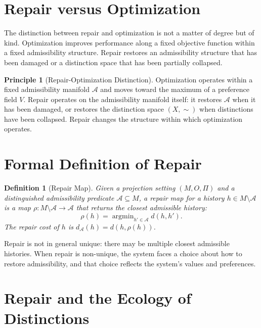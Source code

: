 \documentclass[12pt,a4paper]{book}
\newtheorem{definition}[theorem]{Definition}
\theoremstyle{remark}
\theoremstyle{definition}
\newtheorem{principle}{Principle}[chapter]
\begin{document}
\section{Repair versus Optimization}

The distinction between repair and optimization is not a matter of
degree but of kind. Optimization improves performance along a fixed
objective function within a fixed admissibility structure. Repair
restores an admissibility structure that has been damaged or a
distinction space that has been partially collapsed.

\begin{principle}[Repair-Optimization Distinction]
Optimization operates within a fixed admissibility manifold $\mathcal{A}$
and moves toward the maximum of a preference field $V$. Repair operates
on the admissibility manifold itself: it restores $\mathcal{A}$ when it
has been damaged, or restores the distinction space $(X,\sim)$ when
distinctions have been collapsed. Repair changes the structure within
which optimization operates.
\end{principle}

\section{Formal Definition of Repair}

\begin{definition}[Repair Map]
Given a projection setting $(M, O, \Pi)$ and a distinguished admissibility
predicate $\mathcal{A} \subseteq M$, a \emph{repair map} for a history
$h \in M \setminus \mathcal{A}$ is a map $\rho : M \setminus \mathcal{A}
\to \mathcal{A}$ that returns the closest admissible history:
\begin{equation}
  \rho(h) = \operatorname{argmin}_{h' \in \mathcal{A}} d(h, h').
\end{equation}
The \emph{repair cost} of $h$ is $d_{\mathcal{A}}(h) = d(h, \rho(h))$.
\end{definition}

Repair is not in general unique: there may be multiple closest admissible
histories. When repair is non-unique, the system faces a choice about
how to restore admissibility, and that choice reflects the system's
values and preferences.

\section{Repair and the Ecology of Distinctions}
\end{document}
